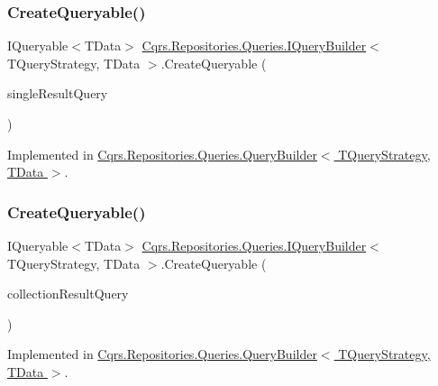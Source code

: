\subsubsection{\texorpdfstring{Create\+Queryable()}{CreateQueryable()}\hspace{0.1cm}{\footnotesize\ttfamily [1/2]}}
{\footnotesize\ttfamily I\+Queryable$<$T\+Data$>$ \hyperlink{interfaceCqrs_1_1Repositories_1_1Queries_1_1IQueryBuilder}{Cqrs.\+Repositories.\+Queries.\+I\+Query\+Builder}$<$ T\+Query\+Strategy, T\+Data $>$.Create\+Queryable (\begin{DoxyParamCaption}\item[{\hyperlink{interfaceCqrs_1_1Repositories_1_1Queries_1_1ISingleResultQuery}{I\+Single\+Result\+Query}$<$ T\+Query\+Strategy, T\+Data $>$}]{single\+Result\+Query }\end{DoxyParamCaption})}



Implemented in \hyperlink{classCqrs_1_1Repositories_1_1Queries_1_1QueryBuilder_a6b103726f538e81ca0489a51b1aa3c88_a6b103726f538e81ca0489a51b1aa3c88}{Cqrs.\+Repositories.\+Queries.\+Query\+Builder$<$ T\+Query\+Strategy, T\+Data $>$}.

\mbox{\label{interfaceCqrs_1_1Repositories_1_1Queries_1_1IQueryBuilder_ab903955b6fb1843a3e168b33252161a5_ab903955b6fb1843a3e168b33252161a5}} 
\subsubsection{\texorpdfstring{Create\+Queryable()}{CreateQueryable()}\hspace{0.1cm}{\footnotesize\ttfamily [2/2]}}
{\footnotesize\ttfamily I\+Queryable$<$T\+Data$>$ \hyperlink{interfaceCqrs_1_1Repositories_1_1Queries_1_1IQueryBuilder}{Cqrs.\+Repositories.\+Queries.\+I\+Query\+Builder}$<$ T\+Query\+Strategy, T\+Data $>$.Create\+Queryable (\begin{DoxyParamCaption}\item[{\hyperlink{interfaceCqrs_1_1Repositories_1_1Queries_1_1ICollectionResultQuery}{I\+Collection\+Result\+Query}$<$ T\+Query\+Strategy, T\+Data $>$}]{collection\+Result\+Query }\end{DoxyParamCaption})}



Implemented in \hyperlink{classCqrs_1_1Repositories_1_1Queries_1_1QueryBuilder_af8860edf3677cb80ae481f17ff2db9b5_af8860edf3677cb80ae481f17ff2db9b5}{Cqrs.\+Repositories.\+Queries.\+Query\+Builder$<$ T\+Query\+Strategy, T\+Data $>$}.

